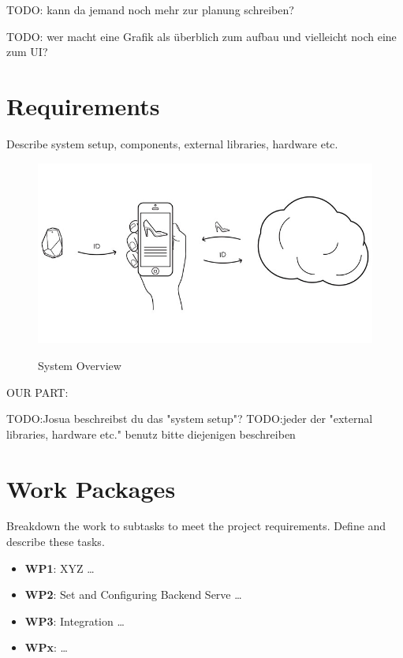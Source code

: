 \documentclass{report}
\newcommand{\lfig}[1]{\label{fig:#1}}
\begin{document}
TODO: kann da jemand noch mehr zur planung schreiben?

TODO: wer macht eine Grafik als überblich zum aufbau und vielleicht noch eine zum UI?


\section{Requirements}
Describe system setup, components, external libraries, hardware etc.


\begin{figure}[h]
	\centering
    \includegraphics[width=\columnwidth]{overview.jpg}
    \lfig{system-overview}
    \vspace{-5mm} %
	\caption{System Overview~\cite{estimote}}
\end{figure}

OUR PART:

TODO:Josua beschreibst du das "system setup"?
TODO:jeder der "external libraries, hardware etc." benutz bitte diejenigen beschreiben


\section{Work Packages}
Breakdown the work to subtasks to meet the project requirements.
Define and describe these tasks.

\begin{itemize}
        \item {\bf WP1}:  XYZ  \ldots    
        \item {\bf WP2}: Set and Configuring Backend Serve  \ldots    
        \item {\bf WP3}: Integration  \ldots 
         \item {\bf WPx}:  \ldots 
\end{itemize}
 
\end{document}
